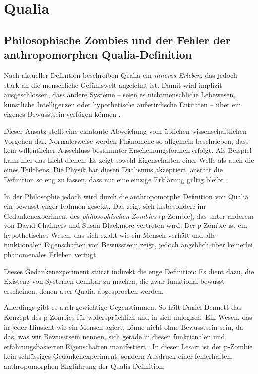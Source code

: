 \chapter*{Qualia}

\section*{Philosophische Zombies und der Fehler der anthropomorphen Qualia-Definition}

Nach aktueller Definition beschreiben Qualia ein \emph{inneres Erleben}, das jedoch stark an die menschliche Gefühlswelt angelehnt ist. Damit wird implizit ausgeschlossen, dass andere Systeme – seien es nichtmenschliche Lebewesen, künstliche Intelligenzen oder hypothetische außerirdische Entitäten – über ein eigenes Bewusstsein verfügen können \cite{Nagel1974}. 

Dieser Ansatz stellt eine eklatante Abweichung vom üblichen wissenschaftlichen Vorgehen dar. Normalerweise werden Phänomene so allgemein beschrieben, dass kein willentlicher Ausschluss bestimmter Erscheinungsformen erfolgt. Als Beispiel kann hier das Licht dienen: Es zeigt sowohl Eigenschaften einer Welle als auch die eines Teilchens. Die Physik hat diesen Dualismus akzeptiert, anstatt die Definition so eng zu fassen, dass nur eine einzige Erklärung gültig bleibt \cite{Heisenberg1930}.

In der Philosophie jedoch wird durch die anthropomorphe Definition von Qualia ein bewusst enger Rahmen gesetzt. Das zeigt sich insbesondere im Gedankenexperiment des \emph{philosophischen Zombies} (p-Zombie), das unter anderem von David Chalmers \cite{Chalmers1996} und Susan Blackmore \cite{Blackmore2005} vertreten wird. Der p-Zombie ist ein hypothetisches Wesen, das sich exakt wie ein Mensch verhält und alle funktionalen Eigenschaften von Bewusstsein zeigt, jedoch angeblich über keinerlei phänomenales Erleben verfügt.

Dieses Gedankenexperiment stützt indirekt die enge Definition: Es dient dazu, die Existenz von Systemen denkbar zu machen, die zwar funktional bewusst erscheinen, denen aber Qualia abgesprochen werden. 

Allerdings gibt es auch gewichtige Gegenstimmen. So hält Daniel Dennett das Konzept des p-Zombies für widersprüchlich und in sich unlogisch: Ein Wesen, das in jeder Hinsicht wie ein Mensch agiert, könne nicht \glqq ohne Bewusstsein\grqq{} sein, da das, was wir Bewusstsein nennen, sich gerade in diesen funktionalen und erfahrungsbasierten Eigenschaften manifestiert \cite{Dennett1991}. In dieser Lesart ist der p-Zombie kein schlüssiges Gedankenexperiment, sondern Ausdruck einer fehlerhaften, anthropomorphen Engführung der Qualia-Definition.


